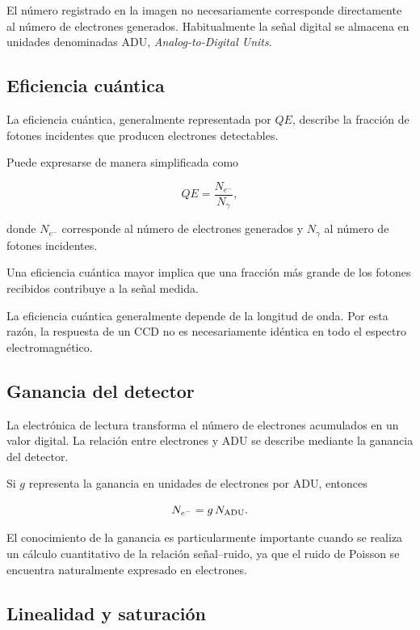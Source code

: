 \documentclass[12pt,letterpaper,oneside]{book}
\begin{document}
El número registrado en la imagen no necesariamente corresponde directamente al número de electrones generados. Habitualmente la señal digital se almacena en unidades denominadas ADU, \textit{Analog-to-Digital Units}.


\subsection{Eficiencia cuántica}

La eficiencia cuántica, generalmente representada por $QE$, describe la fracción de fotones incidentes que producen electrones detectables.

Puede expresarse de manera simplificada como

\[
QE =
\frac{N_{e^-}}{N_{\gamma}},
\]

donde $N_{e^-}$ corresponde al número de electrones generados y $N_{\gamma}$ al número de fotones incidentes.

Una eficiencia cuántica mayor implica que una fracción más grande de los fotones recibidos contribuye a la señal medida.

La eficiencia cuántica generalmente depende de la longitud de onda. Por esta razón, la respuesta de un CCD no es necesariamente idéntica en todo el espectro electromagnético.


\subsection{Ganancia del detector}

La electrónica de lectura transforma el número de electrones acumulados en un valor digital. La relación entre electrones y ADU se describe mediante la ganancia del detector.

Si $g$ representa la ganancia en unidades de electrones por ADU, entonces

\[
N_{e^-} = g\,N_{\rm ADU}.
\]

El conocimiento de la ganancia es particularmente importante cuando se realiza un cálculo cuantitativo de la relación señal--ruido, ya que el ruido de Poisson se encuentra naturalmente expresado en electrones.


\subsection{Linealidad y saturación}
\end{document}
